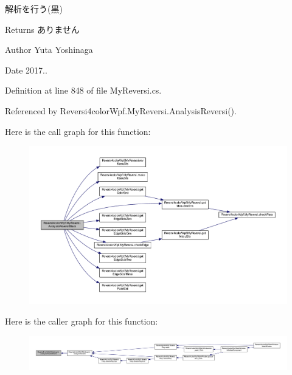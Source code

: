 解析を行う(黒) 

\begin{DoxyReturn}{Returns}
ありません 
\end{DoxyReturn}
\begin{DoxyAuthor}{Author}
Yuta Yoshinaga 
\end{DoxyAuthor}
\begin{DoxyDate}{Date}
2017.. 
\end{DoxyDate}


Definition at line 848 of file My\+Reversi.\+cs.



Referenced by Reversi4color\+Wpf.\+My\+Reversi.\+Analysis\+Reversi().

Here is the call graph for this function\+:
\nopagebreak
\begin{figure}[H]
\begin{center}
\leavevmode
\includegraphics[width=350pt]{class_reversi4color_wpf_1_1_my_reversi_af3e53dce82787cfdad079a37c2c73f61_cgraph}
\end{center}
\end{figure}
Here is the caller graph for this function\+:
\nopagebreak
\begin{figure}[H]
\begin{center}
\leavevmode
\includegraphics[width=350pt]{class_reversi4color_wpf_1_1_my_reversi_af3e53dce82787cfdad079a37c2c73f61_icgraph}
\end{center}
\end{figure}
\mbox{\label{class_reversi4color_wpf_1_1_my_reversi_a4acbdc2f3b8873eb4e5e0858eb4cfc75}} 

